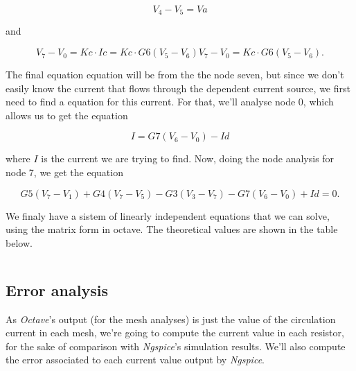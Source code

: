   \begin{equation}
  V_4-V_5 = Va
  \label{eq:Va}
\end{equation}

and

 \begin{equation}
  V_7-V_0 = Kc \cdot Ic = Kc\cdot G6(V_5-V_6) V_7-V_0 = Kc\cdot G6(V_5-V_6).
  \label{eq:Vc}
\end{equation}

\par \noindent The final equation equation will be from the the node seven, but since we don't easily know the current that flows through the dependent current source, we first need to find a equation for this current. For that, we'll analyse node 0, which allows us to get the equation

 \begin{equation}
  I = G7(V_6-V_0) - Id
  \label{eq:corrente}
\end{equation}

\noindent where $I$ is the current we are trying to find. Now, doing the node analysis for node 7, we get the equation

 \begin{equation}
  G5(V_7-V_1)+G4(V_7-V_5)-G3(V_3-V_7)-G7(V_6-V_0)+Id = 0.
  \label{eq:N3}
\end{equation}

\par \noindent We finaly have a sistem of linearly independent equations that we can solve, using the matrix form in octave.
The theoretical values are shown in the table below.
\vspace{5mm}
\begin{table}
\centering
\begin{tabularx}{0.8\textwidth} {
  | >{\raggedright\arraybackslash}X
  | >{\raggedleft\arraybackslash}X | }
 \hline

\end{tabularx}
\end{table}

\subsection{Error analysis}
\label{ssec:Error analysis}
\par \noindent As \emph{Octave}'s output (for the mesh analyses) is just the value of the circulation current in each mesh, we're going to compute the current value in each resistor, for the sake of comparison with \emph{Ngspice}'s simulation results. We'll also compute the error associated to each current value output by \emph{Ngspice}.
\vspace{5mm}

